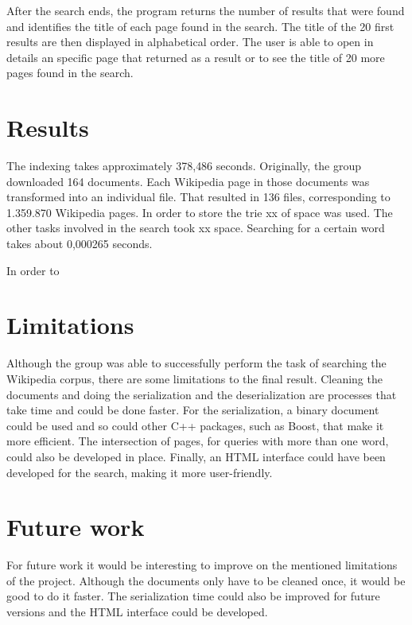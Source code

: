 \documentclass{article}
\begin{document}
After the search ends, the program returns the number of results that were found and identifies the title of each page found in the search. The title of the 20 first results are then displayed in alphabetical order. The user is able to open in details an specific page that returned as a result or to see the title of 20 more pages found in the search. 


\section*{Results}
The indexing takes approximately 378,486 seconds. Originally, the group downloaded 164 documents. Each Wikipedia page in those documents was transformed into an individual file. That resulted in 136 files, corresponding to 1.359.870 Wikipedia pages. In order to store the trie xx of space was used. The other tasks involved in the search took xx space. Searching for a certain word takes about 0,000265 seconds. 

In order to 

\section*{Limitations}
Although the group was able to successfully perform the task of searching the Wikipedia corpus, there are some limitations to the final result. Cleaning the documents and doing the serialization and the deserialization are processes that take time and could be done faster. For the serialization, a binary document could be used and so could other C++ packages, such as Boost, that make it more efficient. The intersection of pages, for queries with more than one word, could also be developed in place. Finally, an HTML interface could have been developed for the search, making it more user-friendly.


\section*{Future work}
For future work it would be interesting to improve on the mentioned limitations of the project. Although the documents only have to be cleaned once, it would be good to do it faster. The serialization time could also be improved for future versions and the HTML interface could be developed. 
\end{document}
